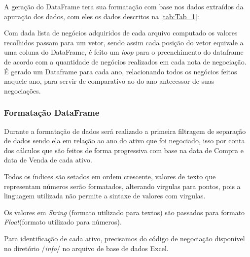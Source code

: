 \par A geração do DataFrame  tera sua formatação com base nos dados extraídos da apuração dos dados, com eles os dados descritos na \autoref{tab:Tab_1}:



\par Com dada lista de negócios adquiridos de cada arquivo computado os valores recolhidos passam para um vetor, sendo assim cada posição do vetor equivale a uma coluna do DataFrame, é feito um \textit{loop} para o preenchimento do dataframe de acordo com a quantidade de negócios realizados em cada nota de negociação. É gerado um Dataframe para cada ano, relacionando todos os negócios feitos naquele ano, para servir de comparativo ao do ano antecessor de suas negociações.

\subsubsection{\textbf{Formatação DataFrame}}


\par Durante a formatação de dados será realizado a primeira filtragem de separação de dados sendo ela em relação ao ano do ativo que foi negociado, isso por conta dos cálculos que são feitos de forma progressiva com base na data de Compra e data de Venda de cada ativo.
\par Todos os índices são setados em ordem crescente, valores de texto que representam números serão formatados, alterando virgulas para pontos, pois a linguagem utilizada não permite a sintaxe de valores com virgulas.
\par Os valores em \textit{String} (formato utilizado para textos) são passados para formato \textit{Float}(formato utilizado para números).

\begin{table}[ht]
\ABNTEXfontereduzida
\caption{\label{tab:Tab_1}Estrutura do DataFrame utilizado molde das notas de negociação.}
\end{table}

\par Para identificação de cada ativo, precisamos do código de negociação disponível no diretório /\textit{info}/ no arquivo de base de dados Excel.
	
